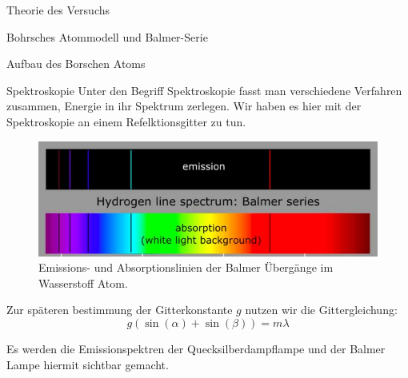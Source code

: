 \documentclass[pdftex, a4paper,11pt, twoside, ngerman]{report}
\begin{document}
\begin{chapter}{Theorie des Versuchs}
\begin{section}{Bohrsches Atommodell und Balmer-Serie}
\begin{subsection}{Aufbau des Borschen Atoms}
	
      \end{subsection}
      
      
      
      \begin{subsection}{Spektroskopie}
	\label{chp:TheorieBohrBalmerSerieSpektroskopie}
	Unter den Begriff Spektroskopie fasst man verschiedene Verfahren zusammen, Energie in ihr Spektrum zerlegen.
        Wir haben es hier mit der Spektroskopie an einem Refelktionsgitter zu tun.
	\begin{figure}[b]
	  \begin{center}
	    \includegraphics[width=.9\textwidth]{Figures/BalmerserieEmissionAbsorption.png}
	    \caption{Emissions- und Absorptionslinien der Balmer Übergänge im Wasserstoff Atom.\cite{bib:BalmerserieEmissionAbsorption}}\label{fig:BalmerserieEmissionAbsorption}
	  \end{center}
	\end{figure}
        Zur späteren bestimmung der Gitterkonstante $g$ nutzen wir die Gittergleichung:
        \[
            g(\sin(\alpha)+\sin(\beta))=m\lambda
        \]
        
        
        Es werden die Emissionspektren der Quecksilberdampflampe und der Balmer Lampe hiermit sichtbar gemacht.
        

\end{subsection}
\end{section}
\end{chapter}
\end{document}

